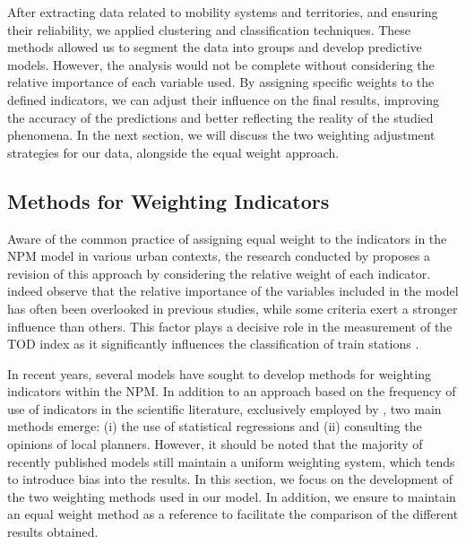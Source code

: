 \begin{refsegment}
After extracting data related to mobility systems and territories, and ensuring their reliability, we applied clustering and classification techniques. These methods allowed us to segment the data into groups and develop predictive models. However, the analysis would not be complete without considering the relative importance of each variable used. By assigning specific weights to the defined indicators, we can adjust their influence on the final results, improving the accuracy of the predictions and better reflecting the reality of the studied phenomena. In the next section, we will discuss the two weighting adjustment strategies for our data, alongside the equal weight approach.%

\subsection{Methods for Weighting Indicators
    \label{chap6:methodologie-ponderation-indicateurs}
    }

Aware of the common practice of assigning equal weight to the indicators in the \acrshort{NPM} model in various urban contexts, the research conducted by \textcolor{blue}{\textcite[9]{liao_evaluating_2022}} proposes a revision of this approach by considering the relative weight of each indicator. \textcolor{blue}{\textcite[15]{monajem_evaluation_2015}} indeed observe that the relative importance of the variables included in the model has often been overlooked in previous studies, while some criteria exert a stronger influence than others. This factor plays a decisive role in the measurement of the \acrshort{TOD} index as it significantly influences the classification of train stations \textcolor{blue}{\autocite[10]{lukman_development_2014}}.%

In recent years, several models have sought to develop methods for weighting indicators within the \acrshort{NPM}. In addition to an approach based on the frequency of use of indicators in the scientific literature, exclusively employed by \textcolor{blue}{\textcite[42]{lyu_developing_2016}}, two main methods emerge: (i) the use of statistical regressions and (ii) consulting the opinions of local planners. However, it should be noted that the majority of recently published models still maintain a uniform weighting system, which tends to introduce bias into the results. In this section, we focus on the development of the two weighting methods used in our model. In addition, we ensure to maintain an equal weight method as a reference to facilitate the comparison of the different results obtained.%


\end{refsegment}

